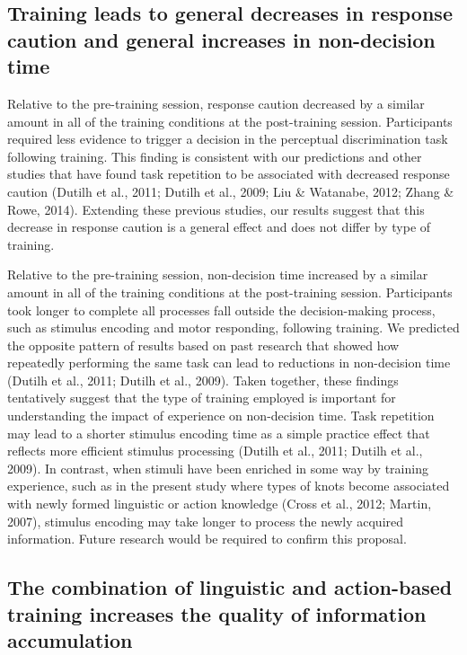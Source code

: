 \documentclass[
  english,
  man, donotrepeattitle,floatsintext]{apa6}
\begin{document}
\subsection{Training leads to general decreases in response caution and general increases in non-decision time}\label{training-leads-to-general-decreases-in-response-caution-and-general-increases-in-non-decision-time}

Relative to the pre-training session, response caution decreased by a similar amount in all of the training conditions at the post-training session. Participants required less evidence to trigger a decision in the perceptual discrimination task following training. This finding is consistent with our predictions and other studies that have found task repetition to be associated with decreased response caution (Dutilh et al., 2011; Dutilh et al., 2009; Liu \& Watanabe, 2012; Zhang \& Rowe, 2014). Extending these previous studies, our results suggest that this decrease in response caution is a general effect and does not differ by type of training.

Relative to the pre-training session, non-decision time increased by a similar amount in all of the training conditions at the post-training session. Participants took longer to complete all processes fall outside the decision-making process, such as stimulus encoding and motor responding, following training. We predicted the opposite pattern of results based on past research that showed how repeatedly performing the same task can lead to reductions in non-decision time (Dutilh et al., 2011; Dutilh et al., 2009). Taken together, these findings tentatively suggest that the type of training employed is important for understanding the impact of experience on non-decision time. Task repetition may lead to a shorter stimulus encoding time as a simple practice effect that reflects more efficient stimulus processing (Dutilh et al., 2011; Dutilh et al., 2009). In contrast, when stimuli have been enriched in some way by training experience, such as in the present study where types of knots become associated with newly formed linguistic or action knowledge (Cross et al., 2012; Martin, 2007), stimulus encoding may take longer to process the newly acquired information. Future research would be required to confirm this proposal.

\subsection{The combination of linguistic and action-based training increases the quality of information accumulation}\label{the-combination-of-linguistic-and-action-based-training-increases-the-quality-of-information-accumulation}
\end{document}
